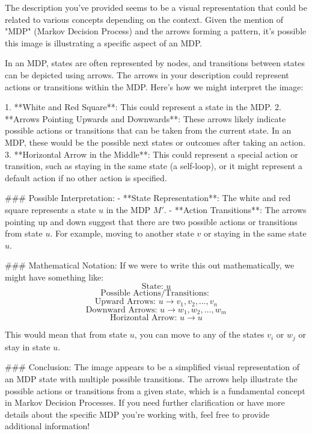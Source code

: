 The description you've provided seems to be a visual representation that could be related to various concepts depending on the context. Given the mention of "MDP" (Markov Decision Process) and the arrows forming a pattern, it's possible this image is illustrating a specific aspect of an MDP.

In an MDP, states are often represented by nodes, and transitions between states can be depicted using arrows. The arrows in your description could represent actions or transitions within the MDP. Here’s how we might interpret the image:

1. **White and Red Square**: This could represent a state in the MDP.
2. **Arrows Pointing Upwards and Downwards**: These arrows likely indicate possible actions or transitions that can be taken from the current state. In an MDP, these would be the possible next states or outcomes after taking an action.
3. **Horizontal Arrow in the Middle**: This could represent a special action or transition, such as staying in the same state (a self-loop), or it might represent a default action if no other action is specified.

### Possible Interpretation:
- **State Representation**: The white and red square represents a state \(u\) in the MDP \(M'\).
- **Action Transitions**: The arrows pointing up and down suggest that there are two possible actions or transitions from state \(u\). For example, moving to another state \(v\) or staying in the same state \(u\).

### Mathematical Notation:
If we were to write this out mathematically, we might have something like:
\[ \text{State: } u \]
\[ \text{Possible Actions/Transitions: } \]
\[ \text{Upward Arrows: } u \rightarrow v_1, v_2, \ldots, v_n \]
\[ \text{Downward Arrows: } u \rightarrow w_1, w_2, \ldots, w_m \]
\[ \text{Horizontal Arrow: } u \rightarrow u \]

This would mean that from state \(u\), you can move to any of the states \(v_i\) or \(w_j\) or stay in state \(u\).

### Conclusion:
The image appears to be a simplified visual representation of an MDP state with multiple possible transitions. The arrows help illustrate the possible actions or transitions from a given state, which is a fundamental concept in Markov Decision Processes. If you need further clarification or have more details about the specific MDP you're working with, feel free to provide additional information!